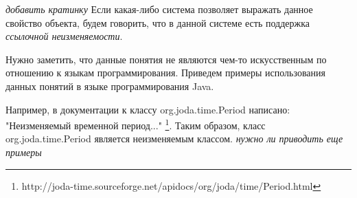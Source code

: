 \textit{добавить кратинку}
Если какая-либо система позволяет выражать данное свойство объекта, будем говорить, что в данной системе есть поддержка \textit{ссылочной неизменяемости}. 

Нужно заметить, что данные понятия не являются чем-то искусственным по отношению к языкам программирования. Приведем примеры использования данных понятий в языке программирования Java.

Например, в документации к классу org.joda.time.Period написано: "Неизменяемый временной период..." \footnote{http://joda-time.sourceforge.net/apidocs/org/joda/time/Period.html}. Таким образом, класс org.joda.time.Period является неизменяемым классом. 
\textit{нужно ли приводить еще примеры}  


